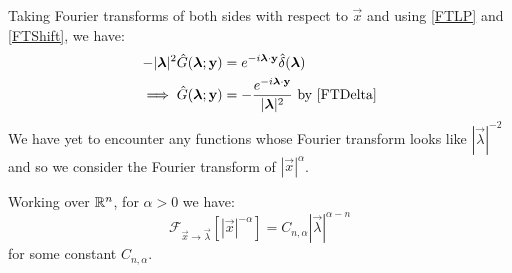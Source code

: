 \documentclass[../main.tex]{subfiles}
\begin{document}
Taking Fourier transforms of both sides with respect to $\vec{x}$ and using \cref{FTLP} and \cref{FTShift}, we have:
\begin{align*}
  -|\vec{\lambda}|^2 \hat{G}(\vec{\lambda}; \vec{y}) &= e^{-i \vec{\lambda} \cdot \vec{y}} \hat{\delta}(\vec{\lambda}) \\
  \implies \hat{G}(\vec{\lambda}; \vec{y}) &= -\frac{e^{-i \vec{\lambda} \cdot \vec{y}}}{|\vec{\lambda}|^2} \text{ by \cref{FTDelta}}
\end{align*}
We have yet to encounter any functions whose Fourier transform looks like $|\vec{\lambda}|^{-2}$ and so we consider the Fourier transform of $|\vec{x}|^{\alpha}$.
\begin{proposition}
  Working over $\mathbb{R}^{n}$, for $\alpha > 0$ we have:
  \[
    \mathcal{F}_{\vec{x} \to \vec{\lambda}}[|\vec{x}|^{-\alpha}] = C_{n, \alpha} |\vec{\lambda}|^{\alpha - n}
  \]
  for some constant $C_{n, \alpha}$.
\end{proposition}
\end{document}
